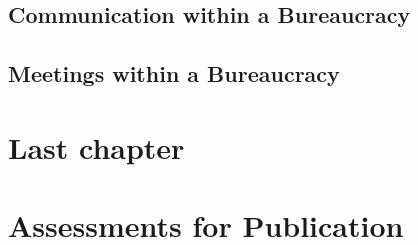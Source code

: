 \documentclass{book}
\begin{document}
    
    
    
    
  
  \newpage
  
    
    
    
    
  \newpage
  \section{Communication within a Bureaucracy}
    
    
    
  \newpage
  \section{Meetings within a Bureaucracy}
    
    
    
    
    
    
    
    
    

\chapter{Last chapter}





\appendix

\chapter{Assessments for Publication}
\newpage %
\newpage  %
\end{document}
